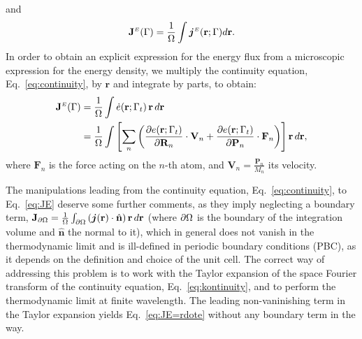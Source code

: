 and
\begin{equation}
  \mathbf{J}^\smallE(\rGamma)  = \frac{1}{\rOmega} \int \bm{j}^\smallE(\mathbf{r};\rGamma) d\mathbf{r}. \label{eq:avg-current-density}
\end{equation}
In order to obtain an explicit expression for the energy flux from a microscopic expression for the energy density, we multiply the continuity equation, Eq.~\eqref{eq:continuity}, by $\mathbf{r}$ and integrate by parts, to obtain:
\begin{align}
  \mathbf{J}^\smallE(\rGamma) &= \frac{1}{\rOmega} \int  \dot e(\mathbf{r};\rGamma_t) \,\mathbf{r}\, d\mathbf{r} \label{eq:JE=rdote} \\
  & = \frac{1}{\rOmega} \int
  \left[ \sum_n \left(
    \frac{\partial e(\mathbf{r};\rGamma_t)}{\partial \mathbf{R}_n} \cdot \mathbf{V}_n +
    \frac{\partial e(\mathbf{r};\rGamma_t)}{\partial \mathbf{P}_n} \cdot \mathbf{F}_n
  \right)  \right] \mathbf{r}\, d\mathbf{r}, \label{eq:JE}
\end{align}
where $ \mathbf{F}_n $ is the force acting on the $n$-th atom, and $\mathbf{V}_n=\frac{\mathbf{P}_n}{M_n}$ its velocity.

The manipulations leading from the continuity equation, Eq.~\eqref{eq:continuity}, to Eq.~\eqref{eq:JE} deserve some further comments, as they imply neglecting a boundary term, $\mathbf{J}_{\partial {\mathrm\Omega}} =
\frac{1}{{\mathrm\Omega}} \int_{\partial{\mathrm\Omega}}
 \left( \bm{j}(\mathbf{r}) \cdot \hat{\mathbf{n}} \right)
\mathbf{r} \,d\mathbf{r} $  (where $ \partial{\mathrm\Omega} $ is the boundary of the integration volume and $\hat{\mathbf{n}}$ the normal to it), which in general does not vanish in the thermodynamic limit and is ill-defined in periodic boundary conditions (PBC), as it depends on the definition and choice of the unit cell. The correct way of addressing this problem is to work with the Taylor expansion of the space Fourier transform of the continuity equation, Eq.~\eqref{eq:kontinuity}, and to perform the thermodynamic limit at finite wavelength. The leading non-vaninishing term in the Taylor expansion yields Eq.~\eqref{eq:JE=rdote} without any boundary term in the way.


